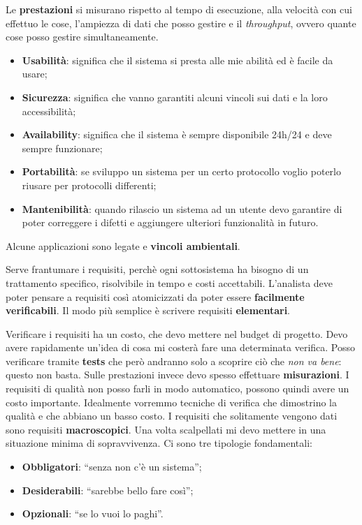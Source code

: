 Le \textbf{prestazioni} si misurano rispetto al tempo di esecuzione, alla velocità con cui effettuo le cose, l'ampiezza di dati che posso gestire e il \textit{throughput}, ovvero quante cose posso gestire simultaneamente.

\begin{itemize}

\item \textbf{Usabilità}: significa che il sistema si presta alle mie abilità ed è facile da usare;

\item \textbf{Sicurezza}: significa che vanno garantiti alcuni vincoli sui dati e la loro accessibilità;

\item \textbf{Availability}: significa che il sistema è sempre disponibile 24h/24 e deve sempre funzionare;

\item \textbf{Portabilità}: se sviluppo un sistema per un certo protocollo voglio poterlo riusare per protocolli differenti;

\item \textbf{Mantenibilità}: quando rilascio un sistema ad un utente devo garantire di poter correggere i difetti e aggiungere ulteriori funzionalità in futuro.

\end{itemize}

Alcune applicazioni sono legate e \textbf{vincoli ambientali}.

Serve frantumare i requisiti, perchè ogni sottosistema ha bisogno di un trattamento specifico, risolvibile in tempo e costi accettabili. L'analista deve poter pensare a requisiti così atomicizzati da poter essere \textbf{facilmente verificabili}. Il modo più semplice è scrivere requisiti \textbf{elementari}.

Verificare i requisiti ha un costo, che devo mettere nel budget di progetto. Devo avere rapidamente un'idea di cosa mi costerà fare una determinata verifica. Posso verificare tramite \textbf{tests} che però andranno solo a scoprire ciò che \textit{non va bene}: questo non basta. Sulle prestazioni invece devo spesso effettuare \textbf{misurazioni}. I requisiti di qualità non posso farli in modo automatico, possono quindi avere un costo importante. Idealmente vorremmo tecniche di verifica che dimostrino la qualità e che abbiano un basso costo. I requisiti che solitamente vengono dati sono requisiti \textbf{macroscopici}. Una volta scalpellati mi devo mettere in una situazione minima di sopravvivenza. Ci sono tre tipologie fondamentali:
\begin{itemize}

	\item \textbf{Obbligatori}: ``senza non c'è un sistema'';
	\item \textbf{Desiderabili}: ``sarebbe bello fare così'';
	\item \textbf{Opzionali}: ``se lo vuoi lo paghi''.

\end{itemize}

